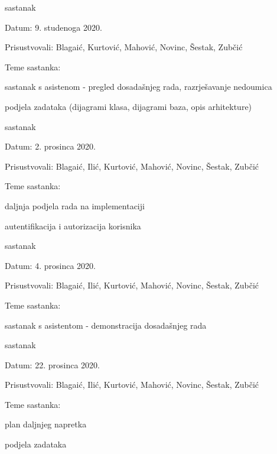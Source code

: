 \begin{packed_enum}
			\item  sastanak
			\item[] \begin{packed_item}
				\item Datum: 9. studenoga 2020.
				\item Prisustvovali: Blagaić, Kurtović, Mahović, Novinc, Šestak, Zubčić
				\item Teme sastanka:
				\begin{packed_item}
					\item  sastanak s asistenom - pregled dosadašnjeg rada, razrješavanje nedoumica
					\item podjela zadataka (dijagrami klasa, dijagrami baza, opis arhitekture)
				\end{packed_item}
			\end{packed_item}
		
			\item  sastanak
			\item[] \begin{packed_item}
				\item Datum: 2. prosinca 2020.
				\item Prisustvovali: Blagaić, Ilić, Kurtović, Mahović, Novinc, Šestak, Zubčić
				\item Teme sastanka:
				\begin{packed_item}
					\item  daljnja podjela rada na implementaciji
					\item  autentifikacija i autorizacija korisnika
				\end{packed_item}
			\end{packed_item}
		
			\item  sastanak
				\item[] \begin{packed_item}
					\item Datum: 4. prosinca 2020.
					\item Prisustvovali: Blagaić, Ilić, Kurtović, Mahović, Novinc, Šestak, Zubčić
					\item Teme sastanka:
					\begin{packed_item}
						\item  sastanak s asistentom - demonstracija dosadašnjeg rada
					\end{packed_item}
				\end{packed_item}
			
			\item  sastanak
			\item[] \begin{packed_item}
				\item Datum: 22. prosinca 2020.
				\item Prisustvovali: Blagaić, Ilić, Kurtović, Mahović, Novinc, Šestak, Zubčić
				\item Teme sastanka:
				\begin{packed_item}
					\item plan daljnjeg napretka
					\item podjela zadataka
				\end{packed_item}
			\end{packed_item}
		

\end{packed_enum}
